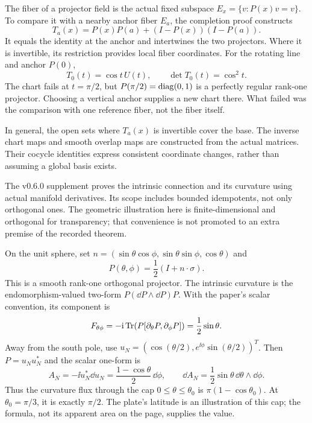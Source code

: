 The fiber of a projector field is the actual fixed subspace $E_x=\{v:P(x)v=v\}$. To compare it with a nearby anchor fiber $E_a$, the completion proof constructs
\[
T_a(x)=P(x)P(a)+(I-P(x))(I-P(a)).
\]
It equals the identity at the anchor and intertwines the two projectors. Where it is invertible, its restriction provides local fiber coordinates.
For the rotating line and anchor $P(0)$,
\[
T_0(t)=\cos t\,U(t),\qquad \det T_0(t)=\cos^2t.
\]
The chart fails at $t=\pi/2$, but $P(\pi/2)=\operatorname{diag}(0,1)$ is a perfectly regular rank-one projector. Choosing a vertical anchor supplies a new chart there. What failed was the comparison with one reference fiber, not the fiber itself.

In general, the open sets where $T_a(x)$ is invertible cover the base. The inverse chart maps and smooth overlap maps are constructed from the actual matrices. Their cocycle identities express consistent coordinate changes, rather than assuming a global basis exists.

The v0.6.0 supplement proves the intrinsic connection and its curvature using actual manifold derivatives. Its scope includes bounded idempotents, not only orthogonal ones. The geometric illustration here is finite-dimensional and orthogonal for transparency; that convenience is not promoted to an extra premise of the recorded theorem.

On the unit sphere, set $n=(\sin\theta\cos\phi,\sin\theta\sin\phi,\cos\theta)$ and
\[
P(\theta,\phi)=\frac12(I+n\cdot\sigma).
\]
This is a smooth rank-one orthogonal projector. The intrinsic curvature is the endomorphism-valued two-form $P(\dd P\wedge\dd P)P$. With the paper's scalar convention, its component is
\[
F_{\theta\phi}=-\mathrm i\operatorname{Tr}\!\left(P[\partial_\theta P,\partial_\phi P]\right)
=\frac12\sin\theta.
\]
Away from the south pole, use $u_N=(\cos(\theta/2),e^{\ii\phi}\sin(\theta/2))^T$. Then $P=u_Nu_N^*$ and the scalar one-form is
\[
A_N=-\ii u_N^*\dd u_N=\frac{1-\cos\theta}{2}\,\dd\phi,
\qquad \dd A_N=\frac12\sin\theta\,\dd\theta\wedge\dd\phi.
\]
Thus the curvature flux through the cap $0\le\theta\le\theta_0$ is $\pi(1-\cos\theta_0)$. At $\theta_0=\pi/3$, it is exactly $\pi/2$. The plate's latitude is an illustration of this cap; the formula, not its apparent area on the page, supplies the value.

